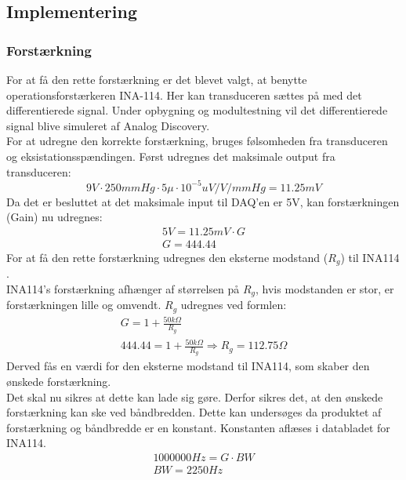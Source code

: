 \subsection{Implementering}
\subsubsection{Forstærkning}
For at få den rette forstærkning er det blevet valgt, at benytte operationsforstærkeren INA-114. Her kan transduceren sættes på med det differentierede signal. Under opbygning og modultestning vil det differentierede signal blive simuleret af Analog Discovery. \\
For at udregne den korrekte forstærkning, bruges følsomheden fra transduceren og eksistationsspændingen.
Først udregnes det maksimale output fra transduceren:   
\begin{equation}
9V\cdot 250mmHg \cdot 5\mu\cdot 10^{-5} uV/V/mmHg  = 11.25mV
\end{equation} 
Da det er besluttet at det maksimale input til DAQ'en \cite{DSB} er 5V, kan forstærkningen (Gain) nu udregnes: 
\begin{equation}
\begin{split}
5V= 11.25mV \cdot G \\
G = 444.44
\end{split}
\end{equation}
For at få den rette forstærkning udregnes den eksterne modstand ($ R_g $) til INA114 \cite{INA}.\\ 
INA114's forstærkning afhænger af størrelsen på $ R_g $, hvis modstanden er stor, er forstærkningen lille og omvendt.  $ R_g $ udregnes ved formlen: 
\begin{equation}
\begin{split}
G=1+\frac{50k\Omega}{R_g}\\
444.44= 1+\frac{50k\Omega}{R_g} \Rightarrow R_g= 112.75 \Omega
\end{split}
\end{equation}
Derved fås en værdi for den eksterne modstand til INA114, som skaber den ønskede forstærkning.\\
Det skal nu sikres at dette kan lade sig gøre. Derfor sikres det, at den ønskede forstærkning kan ske ved båndbredden. Dette kan undersøges da produktet af forstærkning og båndbredde er en konstant. Konstanten aflæses i databladet for INA114\cite{INA}. 
\begin{equation}
\begin{split}
1000000 Hz = G\cdot BW \\
BW = 2250 Hz
\end{split}
\end{equation}
